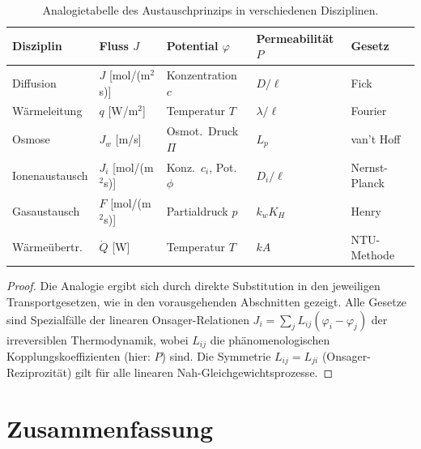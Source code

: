 ﻿\documentclass[a4paper,12pt]{article}
\theoremstyle{definition}
\begin{document}
\begin{table}[h!]
    \centering
    \caption{Analogietabelle des Austauschprinzips in verschiedenen Disziplinen.}
    \label{tab:analogie}
    \begin{tabular}{lllll}
        \toprule
        \textbf{Disziplin} & \textbf{Fluss $J$} & \textbf{Potential $\varphi$}
        & \textbf{Permeabilität $P$} & \textbf{Gesetz} \\
        \midrule
        Diffusion      & $J$ [mol/(m$^2$s)]  & Konzentration $c$   & $D/\ell$     & Fick \\
        Wärmeleitung   & $q$ [W/m$^2$]       & Temperatur $T$      & $\lambda/\ell$ & Fourier \\
        Osmose         & $J_w$ [m/s]         & Osmot.\ Druck $\Pi$ & $L_p$        & van't Hoff \\
        Ionenaustausch & $J_i$ [mol/(m$^2$s)]& Konz.\ $c_i$, Pot.\ $\phi$ & $D_i/\ell$ & Nernst-Planck \\
        Gasaustausch   & $F$ [mol/(m$^2$s)]  & Partialdruck $p$    & $k_w K_H$    & Henry \\
        Wärmeübertr.   & $\dot{Q}$ [W]       & Temperatur $T$      & $kA$         & NTU-Methode \\
        \bottomrule
    \end{tabular}
\end{table}

\begin{proof}
    Die Analogie ergibt sich durch direkte Substitution in den jeweiligen
    Transportgesetzen, wie in den vorausgehenden Abschnitten gezeigt. Alle
    Gesetze sind Spezialfälle der linearen Onsager-Relationen
    $J_i = \sum_j L_{ij}(\varphi_i - \varphi_j)$ der irre\-versiblen
    Thermodynamik, wobei $L_{ij}$ die phänomenologischen Kopplungskoeffizienten
    (hier: $P$) sind. Die Symmetrie $L_{ij} = L_{ji}$ (Onsager-Reziprozität)
    gilt für alle linearen Nah-Gleichgewichtsprozesse. \qedhere
\end{proof}

\section{Zusammenfassung}
\end{document}
